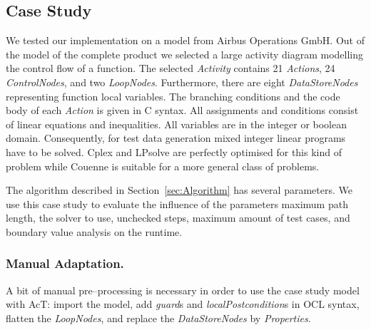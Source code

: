 \documentclass[runningheads,a4paper]{llncs}%
\newcommand{\UMLType}[1]{\textsf{\textit{#1}}} %
\newcommand{\UMLReference}[1]{\textsf{\textit{#1}}} %
\begin{document}
\subsection{Case Study}
\label{sec:CaseStudy}
We tested our implementation on a model from Airbus Operations GmbH. Out of the
model of the complete product we selected a large activity diagram modelling the
control flow of a function. The selected \UMLType{Activity} contains 21
\UMLType{Actions}, 24 \UMLType{ControlNodes}, and two \UMLType{LoopNodes}.
Furthermore, there are eight \UMLType{DataStoreNodes} representing function
local variables. The branching conditions and the code body of each
\UMLType{Action} is given in C syntax. All assignments and conditions consist of
linear equations and inequalities. All variables are in the integer or boolean
domain. Consequently, for test data generation mixed integer linear programs
have to be solved. Cplex and LPsolve are perfectly optimised for this kind of
problem while Couenne is suitable for a more general class of problems.

The algorithm described in Section~\ref{sec:Algorithm} has several parameters.
We use this case study to evaluate the influence of the parameters maximum path
length, the solver to use, unchecked steps, maximum amount of test cases, and
boundary value analysis on the runtime.
%
\subsubsection{Manual Adaptation.}
\label{sec:CaseStudy_ManualAdaptation}
A bit of manual pre--processing is necessary in order to use the case study
model with AcT: import the model, add \UMLReference{guard}s and
\UMLReference{localPostcondition}s in OCL syntax, flatten the
\UMLType{LoopNodes}, and replace the \UMLType{DataStoreNodes} by
\UMLType{Properties}.
\end{document}
